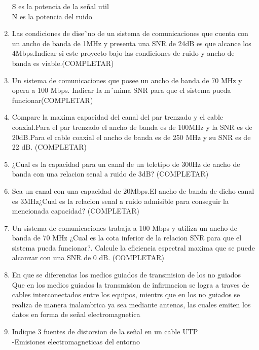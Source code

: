 \documentclass{udparticle}
\begin{document}
\begin{enumerate}
            S es la potencia de la señal util\\
            N es la potencia del ruido\\
    \item  Las condiciones de dise˜no de un sistema de comunicaciones que cuenta con un ancho de banda de 1MHz y presenta una SNR de 24dB es que alcance los 4Mbps.Indicar si este proyecto bajo las condiciones de ruido y ancho de banda es viable.(COMPLETAR) \\
    \item Un sistema de comunicaciones que posee un ancho de banda de 70 MHz y opera a 100 Mbps. Indicar la m´ınima SNR para que el sistema pueda funcionar(COMPLETAR) \\
    \item  Compare la maxima capacidad del canal del par trenzado y el cable coaxial.Para el par trenzado el ancho de banda es de 100MHz y la SNR es de 20dB.Para el cable coaxial el ancho de banda es de 250 MHz y su SNR es de 22 dB. (COMPLETAR)\\
    \item  ¿Cual es la capacidad para un canal de un teletipo de 300Hz de ancho de banda con una relacion senal a ruido de 3dB? (COMPLETAR)\\
    \item Sea un canal con una capacidad de 20Mbps.El ancho de banda de dicho canal es 3MHz¿Cual es la relacion senal a ruido admisible para conseguir la mencionada capacidad? (COMPLETAR)\\
    \item  Un sistema de comunicaciones trabaja a 100 Mbps y utiliza un ancho de banda de 70 MHz ¿Cual es la cota inferior de la relacion SNR para que el sistema pueda funcionar?. Calcule la eﬁciencia espectral maxima que se puede alcanzar con una SNR de 0 dB. (COMPLETAR)\\
    \item En que se diferencias los medios guiados de transmision de los no guiados\\
    Que en los medios guiados la transmision de infirmacion se logra a traves de cables interconectados entre los equipos, mientrs que en los no guiados se realiza de manera inalambrica ya sea mediante antenas, las cuales emiten los datos en forma de señal electromagnetica\\
    \item Indique 3 fuentes de distorsion de la señal en un cable UTP\\
    -Emisiones electromagneticas del entorno\\

\end{enumerate}
\end{document}
